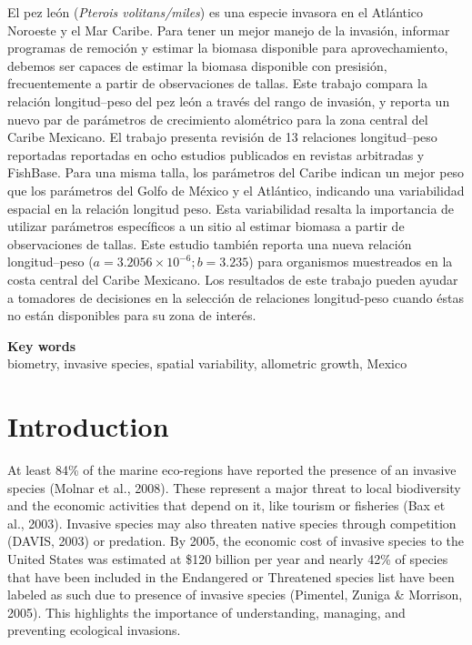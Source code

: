 \documentclass[12pt,]{article}
\begin{document}
El pez león (\emph{Pterois volitans/miles}) es una especie invasora en
el Atlántico Noroeste y el Mar Caribe. Para tener un mejor manejo de la
invasión, informar programas de remoción y estimar la biomasa disponible
para aprovechamiento, debemos ser capaces de estimar la biomasa
disponible con presisión, frecuentemente a partir de observaciones de
tallas. Este trabajo compara la relación longitud--peso del pez león a
través del rango de invasión, y reporta un nuevo par de parámetros de
crecimiento alométrico para la zona central del Caribe Mexicano. El
trabajo presenta revisión de 13 relaciones longitud--peso reportadas
reportadas en ocho estudios publicados en revistas arbitradas y
FishBase. Para una misma talla, los parámetros del Caribe indican un
mejor peso que los parámetros del Golfo de México y el Atlántico,
indicando una variabilidad espacial en la relación longitud peso. Esta
variabilidad resalta la importancia de utilizar parámetros específicos a
un sitio al estimar biomasa a partir de observaciones de tallas. Este
estudio también reporta una nueva relación longitud--peso
(\(a = 3.2056\times 10^{-6}; b = 3.235\)) para organismos muestreados en
la costa central del Caribe Mexicano. Los resultados de este trabajo
pueden ayudar a tomadores de decisiones en la selección de relaciones
longitud-peso cuando éstas no están disponibles para su zona de interés.

\textbf{Key words}\\
biometry, invasive species, spatial variability, allometric growth,
Mexico

\clearpage

\section{Introduction}\label{introduction}

At least 84\% of the marine eco-regions have reported the presence of an
invasive species (Molnar et al., 2008). These represent a major threat
to local biodiversity and the economic activities that depend on it,
like tourism or fisheries (Bax et al., 2003). Invasive species may also
threaten native species through competition (DAVIS, 2003) or predation.
By 2005, the economic cost of invasive species to the United States was
estimated at \$120 billion per year and nearly 42\% of species that have
been included in the Endangered or Threatened species list have been
labeled as such due to presence of invasive species (Pimentel, Zuniga \&
Morrison, 2005). This highlights the importance of understanding,
managing, and preventing ecological invasions.
\end{document}
